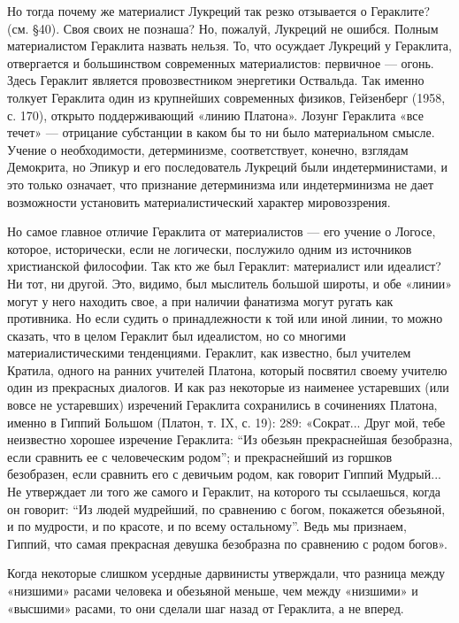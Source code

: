 Но тогда почему же материалист Лукреций так резко отзывается о
Гераклите? (см. §40). Своя своих не познаша? Но, пожалуй, Лукреций не
ошибся. Полным материалистом Гераклита назвать нельзя. То, что
осуждает Лукреций у Гераклита, отвергается и большинством современных
материалистов: первичное --- огонь. Здесь Гераклит является
провозвестником энергетики Оствальда. Так именно толкует Гераклита
один из крупнейших современных физиков, Гейзенберг (1958, с. 170),
открыто поддерживающий «линию Платона». Лозунг Гераклита «все течет»
--- отрицание субстанции в каком бы то ни было материальном смысле.
Учение о необходимости, детерминизме, соответствует, конечно, взглядам
Демокрита, но Эпикур и его последователь Лукреций были
индетерминистами, и это только означает, что признание детерминизма
или индетерминизма не дает возможности установить материалистический
характер мировоззрения.

Но самое главное отличие Гераклита от материалистов --- его учение о
Логосе, которое, исторически, если не логически, послужило одним из
источников христианской философии. Так кто же был Гераклит:
материалист или идеалист? Ни тот, ни другой. Это, видимо, был
мыслитель большой широты, и обе «линии» могут у него находить свое, а
при наличии фанатизма могут ругать как противника. Но если судить о
принадлежности к той или иной линии, то можно сказать, что в целом
Гераклит был идеалистом, но со многими материалистическими
тенденциями. Гераклит, как известно, был учителем Кратила, одного на
ранних учителей Платона, который посвятил своему учителю один из
прекрасных диалогов. И как раз некоторые из наименее устаревших (или
вовсе не устаревших) изречений Гераклита сохранились в сочинениях
Платона, именно в Гиппий Большом (Платон, т. IX, с. 19): 289:
«Сократ... Друг мой, тебе неизвестно хорошее изречение Гераклита:
``Из обезьян прекраснейшая безобразна, если сравнить ее с человеческим
родом''; и прекраснейший из горшков безобразен, если сравнить его с
девичьим родом, как говорит Гиппий Мудрый... Не утверждает ли того же
самого и Гераклит, на которого ты ссылаешься, когда он говорит: ``Из
людей мудрейший, по сравнению с богом, покажется обезьяной, и по
мудрости, и по красоте, и по всему остальному''. Ведь мы признаем,
Гиппий, что самая прекрасная девушка безобразна по сравнению с родом
богов».

Когда некоторые слишком усердные дарвинисты утверждали, что разница
между «низшими» расами человека и обезьяной меньше, чем между
«низшими» и «высшими» расами, то они сделали шаг назад от Гераклита, а
не вперед.

